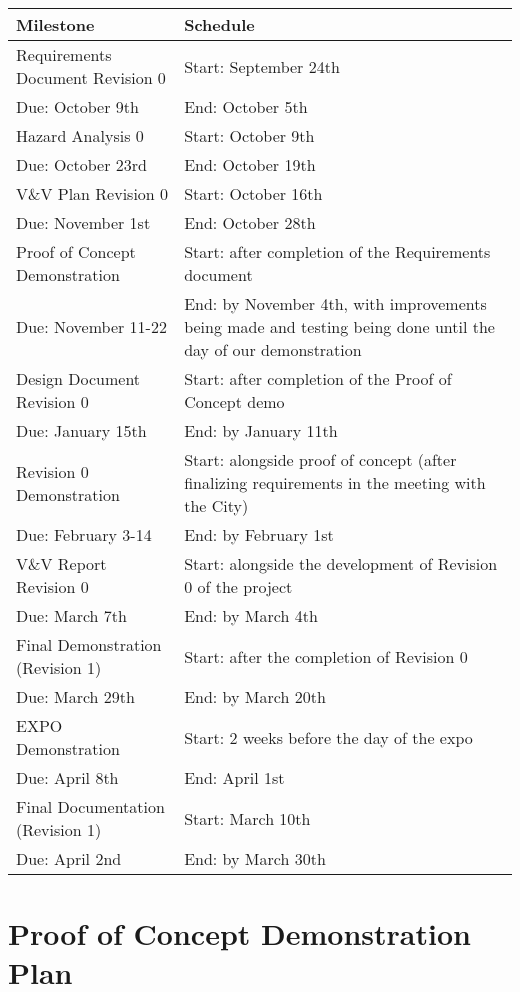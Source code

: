 \documentclass{article}
\begin{document}
\begin{longtable}{|m{4cm}|m{6cm}|}
  \hline
  \textbf{Milestone} & \textbf{Schedule}\\
  \hline
  Requirements Document Revision 0 & Start: September 24th\\
  Due: October 9th & End: October 5th\\
  \hline
  Hazard Analysis 0 & Start: October 9th\\
  Due: October 23rd & End: October 19th\\
  \hline
  V\&V Plan Revision 0 & Start: October 16th\\
  Due: November 1st & End: October 28th\\
  \hline
  Proof of Concept Demonstration & Start: after completion of the
  Requirements document\\
  Due: November 11-22 & End: by November 4th, with improvements being
  made and testing
  being done until the day of our demonstration\\
  \hline
  Design Document Revision 0 & Start: after completion of the Proof
  of Concept demo\\
  Due: January 15th & End: by January 11th\\
  \hline
  Revision 0 Demonstration & Start: alongside proof of concept (after
  finalizing requirements in the meeting with the City)\\
  Due: February 3-14 & End: by February 1st\\
  \hline
  V\&V Report Revision 0 & Start: alongside the development of
  Revision 0 of the project\\
  Due: March 7th & End: by March 4th\\
  \hline
  Final Demonstration (Revision 1) & Start: after the completion of Revision 0\\
  Due: March 29th & End: by March 20th\\
  \hline
  EXPO Demonstration & Start: 2 weeks before the day of the expo\\
  Due: April 8th & End: April 1st\\
  \hline
  Final Documentation (Revision 1) & Start: March 10th\\
  Due: April 2nd & End: by March 30th\\
  \hline
\end{longtable}

\section{Proof of Concept Demonstration Plan}
\end{document}

